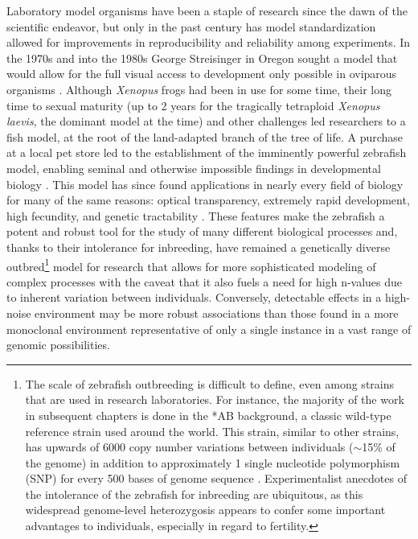 Laboratory model organisms have been a staple of research since the dawn of the scientific endeavor, but only in the past century has model standardization allowed for improvements in reproducibility and reliability among experiments. In the 1970s and into the 1980s George Streisinger in Oregon sought a model that would allow for the full visual access to development only possible in oviparous organisms \citep{Streisinger1981}. Although \textit{Xenopus} frogs had been in use for some time, their long time to sexual maturity (up to 2 years for the tragically tetraploid \textit{Xenopus laevis}, the dominant model at the time) and other challenges led researchers to a fish model, at the root of the land\hyp{}adapted branch of the tree of life. A purchase at a local pet store led to the establishment of the imminently powerful zebrafish model, enabling seminal and otherwise impossible findings in developmental biology \citep{ZFIN}. This model has since found applications in nearly every field of biology for many of the same reasons: optical transparency, extremely rapid development, high fecundity, and genetic tractability \citep{Grunwald2002, Eisen2020}. These features make the zebrafish a potent and robust tool for the study of many different biological processes and, thanks to their intolerance for inbreeding, have remained a genetically diverse outbred\footnote{The scale of zebrafish outbreeding is difficult to define, even among strains that are used in research laboratories. For instance, the majority of the work in subsequent chapters is done in the *AB background, a classic wild\hyp{}type reference strain used around the world. This strain, similar to other strains, has upwards of 6000 copy number variations between individuals ($\sim$15\% of the genome) in addition to approximately 1 single nucleotide polymorphism (SNP) for every 500 bases of genome sequence \citep{Guryev2006, BalikMeisner2018, Brown2012}. Experimentalist anecdotes of the intolerance of the zebrafish for inbreeding are ubiquitous, as this widespread genome\hyp{}level heterozygosis appears to confer some important advantages to individuals, especially in regard to fertility.} model for research that allows for more sophisticated modeling of complex processes with the caveat that it also fuels a need for high n\hyp{}values due to inherent variation between individuals. Conversely, detectable effects in a high\hyp{}noise environment may be more robust associations than those found in a more monoclonal environment representative of only a single instance in a vast range of genomic possibilities.

